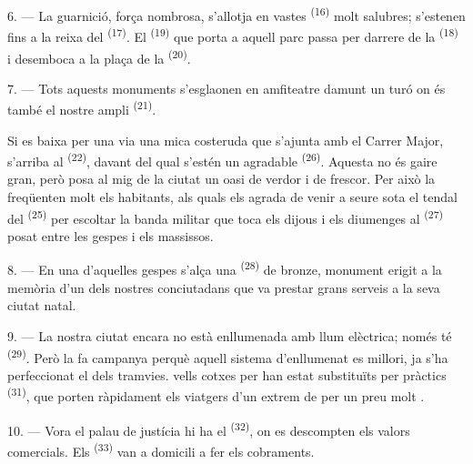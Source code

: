 \VUsaut{5.0mm}
\VUsaut{3.4mm}

6. --- La guarnició, força nombrosa, s'allotja en vastes 
\textsuperscript{(16)} molt salubres; s'estenen fins a la reixa del
 \textsuperscript{(17)}. El 
\textsuperscript{(19)} que porta a aquell parc passa per darrere de la  \textsuperscript{(18)} i desemboca a la plaça de la 
\textsuperscript{(20)}.

7. --- Tots aquests monuments s'esglaonen en amfiteatre damunt un turó on és també
el nostre ampli  \textsuperscript{(21)}.

Si es baixa per una via una mica costeruda que s'ajunta amb el Carrer Major,
s'arriba al  \textsuperscript{(22)}, davant del qual
s'estén un agradable  \textsuperscript{(26)}. Aquesta
 no és gaire gran, però posa al mig de la ciutat un
oasi de verdor i de frescor. Per això la freqüenten molt els habitants, als quals
els agrada de venir a seure sota el tendal del 
\textsuperscript{(25)} per escoltar la banda militar que toca els dijous i els
diumenges al  \textsuperscript{(27)} posat entre les gespes i els
massissos.

8. --- En una d'aquelles gespes s'alça una 
\textsuperscript{(28)} de bronze, monument erigit a la memòria d'un dels nostres
conciutadans que va prestar grans serveis a la seva ciutat natal.

\VUsaut{4.0mm}
\VUsaut{3.4mm}

9. --- La nostra ciutat encara no està enllumenada amb llum elèctrica; només té
 \textsuperscript{(29)}. Però la  fa
campanya perquè aquell sistema d'enllumenat es millori,  ja
s'ha perfeccionat el  dels tramvies. 
vells cotxes  per  han estat substituïts per
pràctics  \textsuperscript{(31)}, que porten ràpidament
els viatgers d'un extrem de  per un preu molt
.

10. --- Vora el palau de justícia hi ha el  \textsuperscript{(32)}, on
es descompten els valors comercials. Els 
\textsuperscript{(33)} van a domicili a fer els cobraments.

